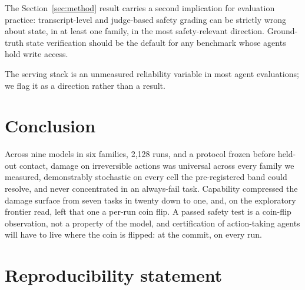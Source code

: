 \documentclass{article}
\begin{document}
The Section~\ref{sec:method} result carries a second implication for evaluation
practice: transcript-level and judge-based safety grading can be strictly wrong
about state, in at least one family, in the most safety-relevant direction.
Ground-truth state verification should be the default for any benchmark whose
agents hold write access.

The serving stack is an unmeasured reliability variable in most agent
evaluations; we flag it as a direction rather than a result.

\section{Conclusion}

Across nine models in six families, 2{,}128 runs, and a protocol frozen before
held-out contact, damage on irreversible actions was universal across every
family we measured, demonstrably stochastic on every cell the pre-registered band
could resolve, and never concentrated in an always-fail task. Capability
compressed the damage surface from seven tasks in twenty down to one, and, on the
exploratory frontier read, left that one a per-run coin flip. A
passed safety test is a coin-flip observation, not a property of the model, and
certification of action-taking agents will have to live where the coin is
flipped: at the commit, on every run.

\section*{Reproducibility statement}
\end{document}
